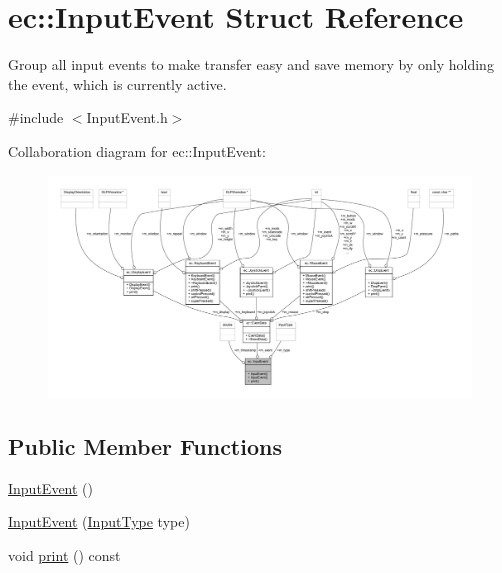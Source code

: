 \hypertarget{structec_1_1_input_event}{}\section{ec\+:\+:Input\+Event Struct Reference}
\label{structec_1_1_input_event}


Group all input events to make transfer easy and save memory by only holding the event, which is currently active.  




{\ttfamily \#include $<$Input\+Event.\+h$>$}



Collaboration diagram for ec\+:\+:Input\+Event\+:\nopagebreak
\begin{figure}[H]
\begin{center}
\leavevmode
\includegraphics[width=350pt]{structec_1_1_input_event__coll__graph}
\end{center}
\end{figure}
\subsection*{Public Member Functions}
\begin{DoxyCompactItemize}
\item 
\mbox{\hyperlink{structec_1_1_input_event_a0e1dd98eb4e1161bdb573afe429d07c8}{Input\+Event}} ()
\item 
\mbox{\hyperlink{structec_1_1_input_event_af8894b724a61a63412f4e6df14a49d7a}{Input\+Event}} (\mbox{\hyperlink{namespaceec_ae2d697393ea83b34b18ab14eb5dacbca}{Input\+Type}} type)
\item 
void \mbox{\hyperlink{structec_1_1_input_event_a778cd0afc60db1b127585a54c61b9e75}{print}} () const
\end{DoxyCompactItemize}
